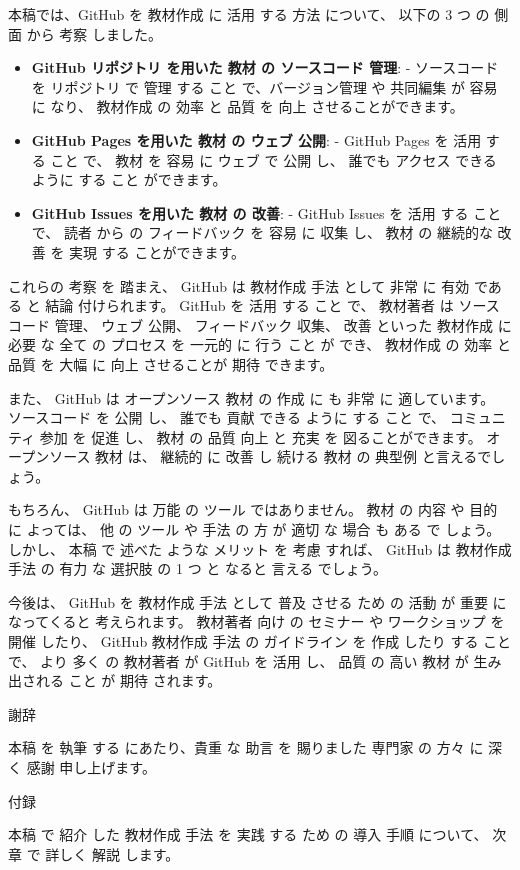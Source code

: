 
本稿では、GitHub を 教材作成 に 活用 する 方法 について、 以下の 3 つ の 側面 から 考察 しました。

\begin{itemize}
    \item \textbf{GitHub リポジトリ を用いた 教材 の ソースコード 管理}:
        - ソースコード を リポジトリ で 管理 する こと で、バージョン管理 や 共同編集 が 容易 に なり、 教材作成 の 効率 と 品質 を 向上 させることができます。
    \item \textbf{GitHub Pages を用いた 教材 の ウェブ 公開}:
        - GitHub Pages を 活用 する こと で、 教材 を 容易 に ウェブ で 公開 し、 誰でも アクセス できる ように する こと ができます。
    \item \textbf{GitHub Issues を用いた 教材 の 改善}:
        - GitHub Issues を 活用 する こと で、 読者 から の フィードバック を 容易 に 収集 し、 教材 の 継続的な 改善 を 実現 する ことができます。
\end{itemize}

これらの 考察 を 踏まえ、 GitHub は 教材作成 手法 として 非常 に 有効 である と 結論 付けられます。
GitHub を 活用 する こと で、 教材著者 は ソースコード 管理、 ウェブ 公開、 フィードバック 収集、 改善 といった 教材作成 に 必要 な 全て の プロセス を 一元的 に 行う こと が でき、 教材作成 の 効率 と 品質 を 大幅 に 向上 させることが 期待 できます。

また、 GitHub は オープンソース 教材 の 作成 に も 非常 に 適しています。
 ソースコード を 公開 し、 誰でも 貢献 できる ように する こと で、 コミュニティ 参加 を 促進 し、 教材 の 品質 向上 と 充実 を 図ることができます。
オープンソース 教材 は、 継続的 に 改善 し 続ける 教材 の 典型例 と言えるでしょう。

もちろん、 GitHub は 万能 の ツール ではありません。
 教材 の 内容 や 目的 に よっては、 他 の ツール や 手法 の 方 が 適切 な 場合 も ある で しょう。
しかし、 本稿 で 述べた ような メリット を 考慮 すれば、 GitHub は 教材作成 手法 の 有力 な 選択肢 の 1 つ と なると 言える でしょう。

今後は、 GitHub を 教材作成 手法 として 普及 させる ため の 活動 が 重要 に なってくると 考えられます。
 教材著者 向け の  セミナー や ワークショップ を 開催 したり、 GitHub 教材作成 手法 の ガイドライン を 作成 したり する こと で、 より 多く の 教材著者 が GitHub を 活用 し、 品質 の 高い 教材 が 生み出される こと が 期待 されます。

謝辞

本稿 を 執筆 する にあたり、貴重 な 助言 を 賜りました 専門家 の 方々 に 深く 感謝 申し上げます。

付録

本稿 で 紹介 した 教材作成 手法 を 実践 する ため の 導入 手順 について、 次章 で 詳しく 解説 します。

